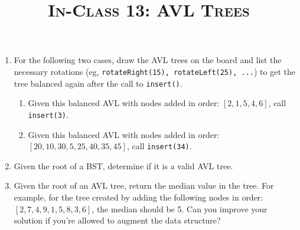\documentclass{article}
\title{\large{\textsc{In-Class 13: AVL Trees}}}
\date{}
\begin{document}
\maketitle

\subsection*{}


\begin{enumerate}






\item For the following two cases, draw the AVL trees on the board and list the necessary rotations (eg, \texttt{rotateRight(15), rotateLeft(25), ...}) to get the tree balanced again after the call to \texttt{insert()}.

\begin{enumerate}
    \item Given this balanced AVL with nodes added in order: $[2, 1, 5, 4, 6]$, call \texttt{insert(3)}.
    
    \item Given this balanced AVL with nodes added in order: $[20,10,30,5,25,40,35,45]$, call \texttt{insert(34)}.
\end{enumerate}


\item Given the root of a BST, determine if it is a valid AVL tree.


\item Given the root of an AVL tree, return the median value in the tree.  For example, for the tree created by adding the following nodes in order: $[2, 7, 4, 9, 1, 5, 8, 3, 6]$, the median should be 5. Can you improve your solution if you're allowed to augment the data structure?

\end{enumerate}
\end{document}
